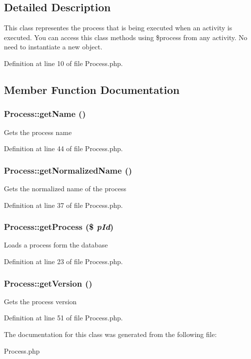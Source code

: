 \subsection{Detailed Description}
This class representes the process that is being executed when an activity is executed. You can access this class methods using \$process from any activity. No need to instantiate a new object. 



Definition at line 10 of file Process.php.

\subsection{Member Function Documentation}
\subsubsection{\setlength{\rightskip}{0pt plus 5cm}Process::get\-Name ()}\label{classProcess_a3}


Gets the process name

Definition at line 44 of file Process.php.
\subsubsection{\setlength{\rightskip}{0pt plus 5cm}Process::get\-Normalized\-Name ()}\label{classProcess_a2}


Gets the normalized name of the process

Definition at line 37 of file Process.php.
\subsubsection{\setlength{\rightskip}{0pt plus 5cm}Process::get\-Process (\$ {\em p\-Id})}\label{classProcess_a1}


Loads a process form the database

Definition at line 23 of file Process.php.
\subsubsection{\setlength{\rightskip}{0pt plus 5cm}Process::get\-Version ()}\label{classProcess_a4}


Gets the process version

Definition at line 51 of file Process.php.

The documentation for this class was generated from the following file:\begin{CompactItemize}
\item 
Process.php\end{CompactItemize}
